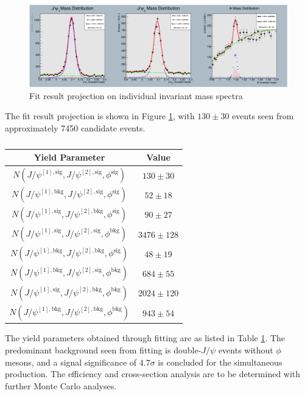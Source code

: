 \documentclass[10pt,twocolumn]{article}
\begin{document}
\begin{figure}
    \centering
    \includegraphics[width=1.0\linewidth]{images/JpsiJpsiPhi_fit.png}
    \caption{Fit result projection on individual invariant mass spectra}
    \label{fig:JpsiJpsiPhi_fit}
\end{figure}

The fit result projection is shown in Figure  \ref{fig:JpsiJpsiPhi_fit}, with $130 \pm 30$ events seen from approximately 7450 candidate events.

\begin{table}[]
    \centering
    \caption{}
    \begin{tabular}{cc}
        \toprule
        \textbf{Yield Parameter} & \textbf{Value} \\
        \midrule
        $N(J/\psi^{[1], \text{sig} },J/\psi^{[2],\text{sig} }, \phi^\text{sig})$ & $130 \pm 30$ \\
        $N(J/\psi^{[1], \text{bkg} },J/\psi^{[2],\text{sig} }, \phi^\text{sig})$ & $52 \pm 18$ \\
        $N(J/\psi^{[1], \text{sig} },J/\psi^{[2],\text{bkg} }, \phi^\text{sig})$ & $90 \pm 27$ \\
        $N(J/\psi^{[1], \text{sig} },J/\psi^{[2],\text{sig} }, \phi^\text{bkg})$ & $3476 \pm 128$ \\
        $N(J/\psi^{[1], \text{bkg} },J/\psi^{[2],\text{bkg} }, \phi^\text{sig})$ & $48 \pm 19$ \\
        $N(J/\psi^{[1], \text{bkg} },J/\psi^{[2],\text{sig} }, \phi^\text{bkg})$ & $684 \pm 55$ \\
        $N(J/\psi^{[1], \text{sig} },J/\psi^{[2],\text{bkg} }, \phi^\text{bkg})$ & $2024 \pm 120$ \\
        $N(J/\psi^{[1], \text{bkg} },J/\psi^{[2],\text{bkg} }, \phi^\text{bkg})$ & $943 \pm 54$ \\
        \bottomrule
    \end{tabular}
    \label{tab:fitres_JpsiJpsiPhi}
\end{table}

The yield parameters obtained through fitting are as listed in Table \ref{tab:fitres_JpsiJpsiPhi}. The predominant background seen from fitting is double-$J/\psi$ events without $\phi$ mesons, and a signal significance of $4.7 \sigma$ is concluded for the simultaneous production. The efficiency and cross-section analysis are to be determined with further Monte Carlo analyses.
\end{document}
